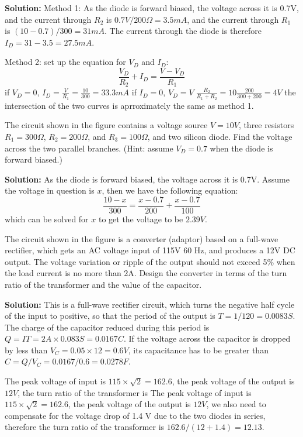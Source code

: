 
 {\bf Solution:} 
 Method 1: As the diode is forward biased, the voltage across it
 is 0.7V, and the current through $R_2$ is $0.7V/200\Omega=3.5mA$, and
 the current through $R_1$ is $(10-0.7)/300=31 mA$. The current through
 the diode is therefore $I_D=31-3.5=27.5 mA$.

 Method 2: set up the equation for $V_D$ and $I_D$:
 \[ \frac{V_D}{R_2}+I_D=\frac{V-V_D}{R_1} \]
 if $V_D=0$, $I_D=\frac{V}{R_1}=\frac{10}{300}=33.3 mA$
 if $I_D=0$, $V_D=V\;\frac{R_2}{R_1+R_2}=10\frac{200}{300+200}=4V$
 the intersection of the two curves is aprroximately the same as method 1.


\item The circuit shown in the figure contains a voltage source $V=10V$,
three resistors $R_1=300\Omega$, $R_2=200\Omega$, and $R_3=100\Omega$, 
and two silicon diode. Find the voltage across the two parallel branches.
(Hint: assume $V_D=0.7$ when the diode is forward biased.)


 {\bf Solution:} As the diode is forward biased, the voltage across it
 is 0.7V. Assume the voltage in question is $x$, then we have the following
 equation:
 \[	\frac{10-x}{300}=\frac{x-0.7}{200}+\frac{x-0.7}{100}	\]
 which can be solved for $x$ to get the voltage to be $2.39V$.


\item The circuit shown in the figure is a converter (adaptor) based on
a full-wave rectifier, which gets an AC voltage input of 115V 60 Hz, and
produces a 12V DC output. The voltage variation or ripple of the output
should not exceed 5\% when the load current is no more than 2A. Design 
the converter in terms of the turn ratio of the transformer and the 
value of the capacitor. 


{\bf Solution:} This is a full-wave rectifier circuit, which turns the
negative half cycle of the input to positive, so that the period of the
output is $T=1/120=0.0083S$. The charge of the capacitor reduced during
this period is $Q=IT=2A\times 0.083 S=0.0167 C$. If the voltage across
the capacitor is dropped by less than $V_C=0.05\times 12=0.6V$, its 
capacitance has to be greater than $C=Q/V_C=0.0167/0.6=0.0278 F$.

The peak voltage of input is $115\times \sqrt{2}=162.6$, the peak voltage
of the output is $12V$, the turn ratio of the transformer is 
The peak voltage of input is $115\times \sqrt{2}=162.6$, the peak voltage
of the output is $12V$, we also need to compensate for the voltage drop of
1.4 V due to the two diodes in series, therefore the turn ratio of the 
transformer is $162.6/(12+1.4)=12.13$.

